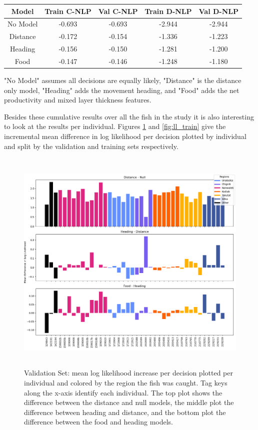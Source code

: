\documentclass[11pt]{article}
\begin{document}
\begin{center}
\begin{tabular}{| c | c | c | c | c |}
\hline 
Model & Train C-NLP & Val C-NLP & Train D-NLP & Val D-NLP \\
\hline
No Model & -0.693 & -0.693 & -2.944 & -2.944 \\
Distance & -0.172 & -0.154 & -1.336 & -1.223 \\
Heading & -0.156 & -0.150 & -1.281 & -1.200 \\
Food & -0.147 & -0.146 & -1.248 & -1.180 \\
\hline
\end{tabular}
\end{center}

"No Model" assumes all decisions are equally likely, "Distance" is the distance only model, "Heading" adds the movement heading, and "Food" adds the net productivity and mixed layer thickness features. \newline

Besides these cumulative results over all the fish in the study it is also interesting to look at the results per individual. Figures \ref{fig:ll_val} and \ref{fig:ll_train} give the incremental mean difference in log likelihood per decision plotted by individual and split by the validation and training sets respectively. 

\begin{figure}[h!] 
	\centering
  \includegraphics[height=110mm]{figures/ll_change_val.png}
  \caption{Validation Set: mean log likelihood increase per decision plotted per individual and colored  by the region the fish was caught. Tag keys along the x-axis identify each individual. The top plot shows the difference between the distance and null models, the middle plot the difference between heading and distance, and the bottom plot the difference between the food and heading models.}
  \label{fig:ll_val}
\end{figure}
\end{document}
